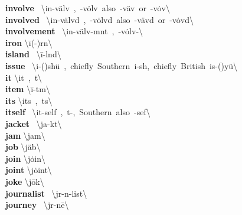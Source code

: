 \documentclass[10pt,a4paper]{article}
\begin{document}
\begin{multicols}{2}
\textbf{ involve }\quad \ \textbackslash in-\textprimstress v\"{a}lv\ ,\ -\textprimstress v\.{o}lv\ also\ -\textprimstress v\"{a}v\ or\ -\textprimstress v\.{o}v\textbackslash \\
\textbf{ involved }\quad \ \textbackslash in-\textprimstress v\"{a}lvd\ ,\ -\textprimstress v\.{o}lvd\ also\ -\textprimstress v\"{a}vd\ or\ -\textprimstress v\.{o}vd\textbackslash \\
\textbf{ involvement }\quad \ \textbackslash in-\textprimstress v\"{a}lv-m\textschwa nt\ ,\ -\textprimstress v\.{o}lv-\textbackslash \\
\textbf{ iron }\quad \textbackslash \textprimstress \={i}(-\textschwa )rn\textbackslash \\
\textbf{ island }\quad \ \textbackslash \textprimstress \={i}-l\textschwa nd\textbackslash \\
\textbf{ issue }\quad \ \textbackslash \textprimstress i-(\textsecstress )sh\"{u}\ ,\ chiefly\ Southern\ \textprimstress i-sh\textschwa ,\ chiefly\ British\ \textprimstress is-(\textsecstress )y\"{u}\textbackslash \\
\textbf{ it }\quad \textbackslash \textprimstress it\ ,\ \textschwa t\textbackslash \\
\textbf{ item }\quad \textbackslash \textprimstress \={i}-t\textschwa m\textbackslash \\
\textbf{ its }\quad \textbackslash \textprimstress its\ ,\ \textschwa ts\textbackslash \\
\textbf{ itself }\quad \ \textbackslash it-\textprimstress self\ ,\ \textschwa t-,\ Southern\ also\ -\textprimstress sef\textbackslash \\
\textbf{ jacket }\quad \ \textbackslash \textprimstress ja-k\textschwa t\textbackslash \\
\textbf{ jam }\quad \textbackslash \textprimstress jam\textbackslash \\
\textbf{ job }\quad \textbackslash \textprimstress j\"{a}b\textbackslash \\
\textbf{ join }\quad \textbackslash \textprimstress j\.{o}in\textbackslash \\
\textbf{ joint }\quad \textbackslash \textprimstress j\.{o}int\textbackslash \\
\textbf{ joke }\quad \textbackslash \textprimstress j\={o}k\textbackslash \\
\textbf{ journalist }\quad \ \textbackslash \textprimstress j\textschwa r-n\textschwa -list\textbackslash \\
\textbf{ journey }\quad \ \textbackslash \textprimstress j\textschwa r-n\={e}\textbackslash \\

\end{multicols}
\end{document}
